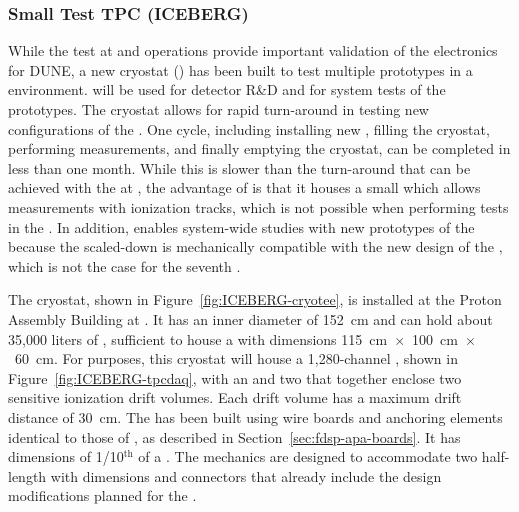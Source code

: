 \subsubsection{Small Test TPC (ICEBERG)}
\label{sec:fdsp-tpcelec-qa-facilities-testtpc}

While the \coldbox test at  and  operations provide important 
validation of the  electronics for DUNE, a new cryostat () 
has been built to test multiple  prototypes in a  environment.
 will be used for 
 detector R\&D and for system tests of the  prototypes. 
The  cryostat allows for rapid turn-around in testing new configurations
of the . One cycle, including installing new , filling the cryostat,
performing measurements, and finally emptying the cryostat, can be completed in less than
one month. While this is slower than the turn-around that can be achieved with the
\coldbox at , the advantage of  is that it houses a small  which
allows measurements with ionization tracks, which is not possible when performing
tests in the \coldbox. In addition,  enables system-wide studies with new
prototypes of the  because the scaled-down  is mechanically compatible with the 
new design of the , which is not the case for the seventh  .  

The  cryostat, shown in Figure~\ref{fig:ICEBERG-cryotee}, is installed
at the Proton Assembly Building at . It has an inner diameter of \SI{152}{cm}
and can hold about 35,000 liters of , sufficient to house a
 with dimensions \SI{115}{cm}~$\times$~\SI{100}{cm}~$\times$~\SI{60}{cm}. For
 purposes, this cryostat will house a 1,280-channel , shown in
Figure~\ref{fig:ICEBERG-tpcdaq}, with an  and two  that
together enclose two sensitive ionization drift volumes. Each drift volume has 
a maximum drift distance of \SI{30}{cm}. The  
has been built using wire boards and anchoring elements identical to
those of , as 
described in Section~\ref{sec:fdsp-apa-boards}. It has dimensions of 
1/10$^{\mathrm{th}}$ of a  . The  mechanics are designed to
accommodate two half-length   with dimensions and connectors that already 
include the design modifications planned for the  .

